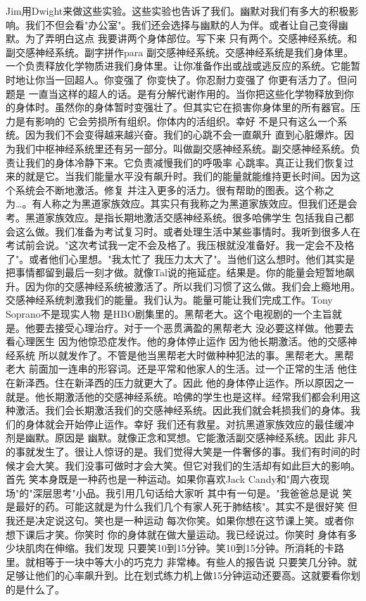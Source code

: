 Jim用Dwight来做这些实验。这些实验也告诉了我们。幽默对我们有多大的积极影响。我们不但会看"办公室"。我们还会选择与幽默的人为伴。或者让自己变得幽默。为了弄明白这点 我要讲两个身体部位。写下来 只有两个。交感神经系统。和副交感神经系统。副字拼作para 副交感神经系统。交感神经系统是我们身体里。一个负责释放化学物质进我们身体里。让你准备作出或战或逃反应的系统。它能暂时地让你当一回超人。你变强了 你变快了。你忍耐力变强了 你更有活力了。但问题是 一直当这样的超人的话。是有分解代谢作用的。当你把这些化学物释放到你的身体时。虽然你的身体暂时变强壮了。但其实它在损害你身体里的所有器官。压力是有影响的 它会劳损所有组织。你体内的活组织。幸好 不是只有这么一个系统。因为我们不会变得越来越兴奋。我们的心跳不会一直飙升 直到心脏爆炸。因为我们中枢神经系统里还有另一部分。叫做副交感神经系统。副交感神经系统。负责让我们的身体冷静下来。它负责减慢我们的呼吸率 心跳率。真正让我们恢复过来的就是它。当我们能量水平没有飙升时。我们的能量就能维持更长时间。因为这个系统会不断地激活。修复 并注入更多的活力。很有帮助的图表。这个称之为…。有人称之为黑道家族效应。其实只有我称之为黑道家族效应。但我们还是会考。黑道家族效应。是指长期地激活交感神经系统。很多哈佛学生 包括我自己都会这么做。我们准备为考试复习时。或者处理生活中某些事情时。我听到很多人在考试前会说。"这次考试我一定不会及格了。我压根就没准备好。我一定会不及格了"。或者他们心里想。"我太忙了 我压力太大了"。当他们这么想时。他们其实是把事情都留到最后一刻才做。就像Tal说的拖延症。结果是。你的能量会短暂地飙升。因为你的交感神经系统被激活了。所以我们习惯了这么做。我们会上瘾地用。交感神经系统刺激我们的能量。我们认为。能量可能让我们完成工作。Tony Soprano不是现实人物 是HBO剧集里的。黑帮老大。这个电视剧的一个主旨就是。他要去接受心理治疗。对于一个恶贯满盈的黑帮老大 没必要这样做。他要去看心理医生 因为他惊恐症发作。他的身体停止运作 因为他长期激活。他的交感神经系统 所以就发作了。不管是他当黑帮老大时做种种犯法的事。黑帮老大。黑帮老大 前面加一连串的形容词。还是平常和他家人的生活。过一个正常的生活 他住在新泽西。住在新泽西的压力就更大了。因此 他的身体停止运作。所以原因之一就是。他长期激活他的交感神经系统。哈佛的学生也是这样。经常我们都会利用这种激活。我们会长期激活我们的交感神经系统。因此我们就会耗损我们的身体。我们的身体就会开始停止运作。幸好 我们还有救星。对抗黑道家族效应的最佳缓冲剂是幽默。原因是 幽默。就像正念和冥想。它能激活副交感神经系统。因此 非凡的事就发生了。很让人惊讶的是。我们觉得大笑是一件奢侈的事。我们有时间的时候才会大笑。我们没事可做时才会大笑。但它对我们的生活却有如此巨大的影响。首先 笑本身既是一种药也是一种运动。如果你喜欢Jack Candy和"周六夜现场"的"深层思考"小品。我引用几句话给大家听 其中有一句是。"我爸爸总是说 笑是最好的药。可能这就是为什么我们几个有家人死于肺结核"。其实不是很好笑 但我还是决定说这句。笑也是一种运动 每次你笑。如果你想在这节课上笑。或者你想下课后才笑。你笑时 你的身体就在做大量运动。我已经说过。你笑时 身体有多少块肌肉在伸缩。我们发现 只要笑10到15分钟。笑10到15分钟。所消耗的卡路里。就相等于一块中等大小的巧克力 非常棒。有些人的报告说 只要笑几分钟。就足够让他们的心率飙升到。比在划式练力机上做15分钟运动还要高。这就要看你划的是什么了。 

